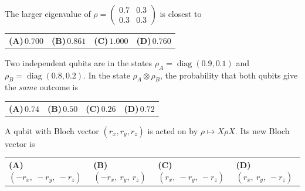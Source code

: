 \documentclass[11pt,a4paper]{article}
\newcommand{\optlabel}[1]{\textbf{(#1)}}
\newenvironment{qitem}[1]{\begin{list}{}{\setlength{\leftmargin}{3.3em}\setlength{\labelwidth}{3.1em}%
  \setlength{\labelsep}{0.2em}\setlength{\topsep}{3pt}\setlength{\parsep}{3pt}}\item[\textbf{Q.#1}\hfill]}{\end{list}}
\newcommand{\qsep}{\par\vspace{2pt}{\color{black!15}\hrule}\vspace{4pt}}
\begin{document}
\begin{qitem}{12}
The larger eigenvalue of $\rho = \begin{pmatrix}0.7 & 0.3\\ 0.3 & 0.3\end{pmatrix}$ is closest to
\par\smallskip\noindent\begin{tabularx}{\linewidth}{@{}*{4}{L}@{}}
\optlabel{A}\,$0.700$ & \optlabel{B}\,$0.861$ & \optlabel{C}\,$1.000$ & \optlabel{D}\,$0.760$
\end{tabularx}
\end{qitem}
\qsep

\begin{qitem}{13}
Two independent qubits are in the states $\rho_A = \operatorname{diag}(0.9, 0.1)$ and $\rho_B = \operatorname{diag}(0.8, 0.2)$. In the
state $\rho_A\otimes\rho_B$, the probability that both qubits give the \emph{same} outcome is
\par\smallskip\noindent\begin{tabularx}{\linewidth}{@{}*{4}{L}@{}}
\optlabel{A}\,$0.74$ & \optlabel{B}\,$0.50$ & \optlabel{C}\,$0.26$ & \optlabel{D}\,$0.72$
\end{tabularx}
\end{qitem}
\qsep

\begin{qitem}{14}
A qubit with Bloch vector $(r_x, r_y, r_z)$ is acted on by $\rho \mapsto X\rho X$. Its new Bloch vector is
\par\smallskip\noindent\begin{tabularx}{\linewidth}{@{}*{4}{L}@{}}
\optlabel{A}\,$(-r_x,\ -r_y,\ -r_z)$ & \optlabel{B}\,$(-r_x,\ r_y,\ r_z)$ & \optlabel{C}\,$(r_x,\ -r_y,\ -r_z)$ & \optlabel{D}\,$(r_x,\ r_y,\ -r_z)$
\end{tabularx}
\end{qitem}
\qsep
\end{document}

